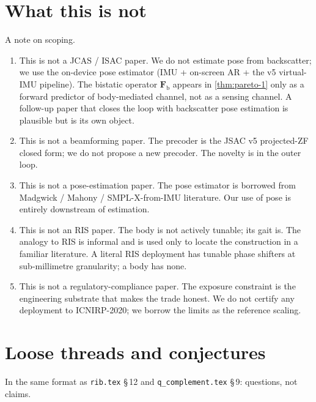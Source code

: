 \documentclass[11pt,a4paper]{article}
\theoremstyle{definition}
\newcommand{\Frib}{\mathbf{F}_{\mathrm{b}}}
\begin{document}
\section{What this is not}\label{sec:notthis}

A note on scoping.

\begin{enumerate}[leftmargin=1.6em,itemsep=3pt]
\item This is not a JCAS / ISAC paper.  We do not estimate pose from
backscatter; we use the on-device pose estimator (IMU + on-screen
AR + the v5 virtual-IMU pipeline).  The bistatic operator
$\Frib$ appears in \cref{thm:pareto-1} only as a forward predictor
of body-mediated channel, not as a sensing channel.  A follow-up
paper that closes the loop with backscatter pose estimation is
plausible but is its own object.
\item This is not a beamforming paper.  The precoder is the
JSAC v5 projected-ZF closed form; we do not propose a new
precoder.  The novelty is in the outer loop.
\item This is not a pose-estimation paper.  The pose estimator is
borrowed from Madgwick / Mahony / SMPL-X-from-IMU literature.
Our use of pose is entirely downstream of estimation.
\item This is not an RIS paper.  The body is not actively tunable;
its gait is.  The analogy to RIS is informal and is used only to
locate the construction in a familiar literature.  A literal RIS
deployment has tunable phase shifters at sub-millimetre granularity;
a body has none.
\item This is not a regulatory-compliance paper.  The exposure
constraint is the engineering substrate that makes the trade
honest.  We do not certify any deployment to ICNIRP-2020; we
borrow the limits as the reference scaling.
\end{enumerate}

\section{Loose threads and conjectures}\label{sec:threads}

In the same format as \texttt{rib.tex} \S\,12 and
\texttt{q\_complement.tex} \S\,9: questions, not claims.
\end{document}
